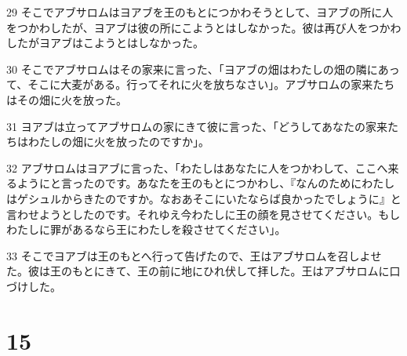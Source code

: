 \par 29 そこでアブサロムはヨアブを王のもとにつかわそうとして、ヨアブの所に人をつかわしたが、ヨアブは彼の所にこようとはしなかった。彼は再び人をつかわしたがヨアブはこようとはしなかった。
\par 30 そこでアブサロムはその家来に言った、「ヨアブの畑はわたしの畑の隣にあって、そこに大麦がある。行ってそれに火を放ちなさい」。アブサロムの家来たちはその畑に火を放った。
\par 31 ヨアブは立ってアブサロムの家にきて彼に言った、「どうしてあなたの家来たちはわたしの畑に火を放ったのですか」。
\par 32 アブサロムはヨアブに言った、「わたしはあなたに人をつかわして、ここへ来るようにと言ったのです。あなたを王のもとにつかわし、『なんのためにわたしはゲシュルからきたのですか。なおあそこにいたならば良かったでしょうに』と言わせようとしたのです。それゆえ今わたしに王の顔を見させてください。もしわたしに罪があるなら王にわたしを殺させてください」。
\par 33 そこでヨアブは王のもとへ行って告げたので、王はアブサロムを召しよせた。彼は王のもとにきて、王の前に地にひれ伏して拝した。王はアブサロムに口づけした。

\chapter{15}

